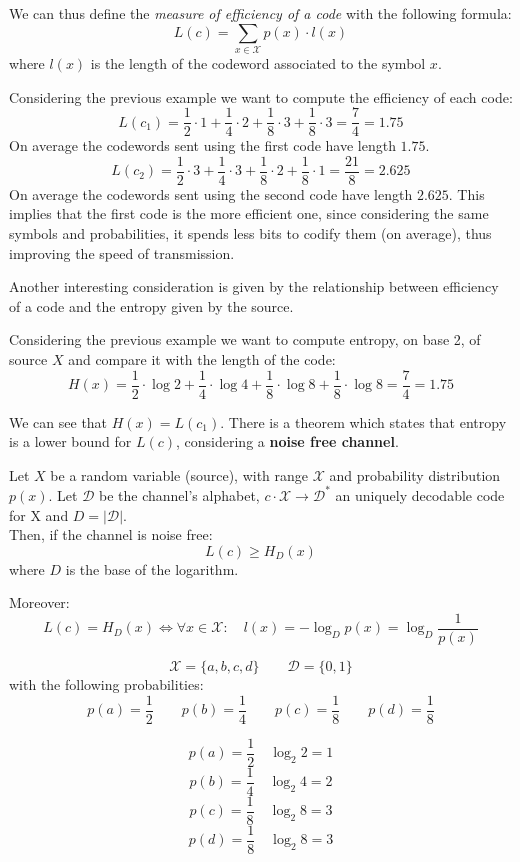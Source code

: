 We can thus define the \textit{measure of efficiency of a code} with the following formula:
		$$L(c)=\sum_{x \in \mathcal{X}} p(x)\cdot l(x)$$
where $l(x)$ is the length of the codeword associated to the symbol $x$.

\begin{exmp} Considering the previous example we want to compute the efficiency of each code:
	$$
		L(c_1) = \frac{1}{2} \cdot 1 + \frac{1}{4} \cdot 2 + \frac{1}{8} \cdot 3 + \frac{1}{8} \cdot 3 = \frac{7}{4} = 1.75
	$$
	On average the codewords sent using the first code have length $1.75$.
	$$	
		L(c_2) = \frac{1}{2} \cdot 3 + \frac{1}{4} \cdot 3 + \frac{1}{8} \cdot 2 + \frac{1}{8} \cdot 1 = \frac{21}{8} = 2.625
	$$
	On average the codewords sent using the second code have length $2.625$. This implies that the first code is the more efficient one, since considering the same symbols and probabilities, it spends less bits to codify them (on average), thus improving the speed of transmission.
\end{exmp}

Another interesting consideration is given by the relationship between efficiency of a code and the entropy given by the source.

\begin{exmp} Considering the previous example we want to compute entropy, on base 2, of source $X$ and compare it with the length of the code:
	$$
		H(x) = \frac{1}{2} \cdot \log2 + \frac{1}{4} \cdot \log4 + \frac{1}{8} \cdot \log8 + \frac{1}{8} \cdot \log8 = \frac{7}{4} = 1.75
	$$
\end{exmp}

We can see that $H(x) = L(c_1)$. There is a theorem which states that entropy is a lower bound for $L(c)$, considering a \textbf{noise free channel}.
\begin{thm} 
	Let $X$ be a random variable (source), with range $\mathcal{X}$ and probability distribution $p(x)$. 
	Let $\mathcal{D}$ be the channel's alphabet, $c \cdot \mathcal{X} \rightarrow \mathcal{D}^*$ an uniquely decodable code for X and $D = |\mathcal{D}|$.\\
	Then, if the channel is noise free: 
	$$ L(c) \geq H_D(x)$$
	where $D$ is the base of the logarithm. 
	
	Moreover:
	$$ L(c) = H_D(x) \iff \forall x \in \mathcal{X}: \quad l(x) = -\log_D p(x) = \log_D \frac{1}{p(x)} $$
\end{thm}

\begin{exmp}
$$\mathcal{X} = \{a, b, c, d\} \qquad \mathcal{D} = \{0,1\}$$
with the following probabilities:
$$p(a) = \frac{1}{2} \qquad p(b) = \frac{1}{4} \qquad p(c) = \frac{1}{8} \qquad p(d) = \frac{1}{8}$$

$$ p(a) = \frac{1}{2} \quad \log_2 2 = 1$$
$$ p(b) = \frac{1}{4} \quad \log_2 4 = 2$$
$$ p(c) = \frac{1}{8} \quad \log_2 8 = 3$$
$$ p(d) = \frac{1}{8} \quad \log_2 8 = 3$$
\end{exmp}

